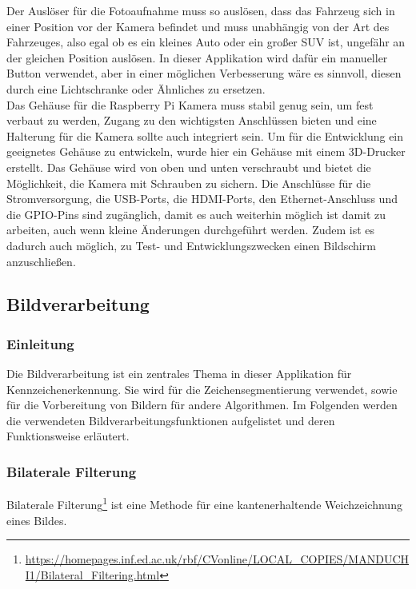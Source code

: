 Der Auslöser für die Fotoaufnahme muss so auslösen, dass das Fahrzeug sich in einer Position vor der Kamera befindet 
und muss unabhängig von der Art des Fahrzeuges, also egal ob es ein kleines Auto oder ein großer SUV ist, ungefähr an der gleichen Position auslösen. 
In dieser Applikation wird dafür ein manueller Button verwendet, aber in einer möglichen Verbesserung wäre es sinnvoll, diesen durch eine Lichtschranke oder Ähnliches zu ersetzen.\\

Das Gehäuse für die Raspberry Pi Kamera muss stabil genug sein, um fest verbaut zu werden, Zugang zu den wichtigsten Anschlüssen 
bieten und eine Halterung für die Kamera sollte auch integriert sein. Um für die Entwicklung ein geeignetes Gehäuse zu entwickeln, wurde hier ein 
Gehäuse mit einem 3D-Drucker erstellt. Das Gehäuse wird von oben und unten verschraubt und bietet die Möglichkeit, die Kamera mit Schrauben zu sichern. 
Die Anschlüsse für die Stromversorgung, die USB-Ports, die HDMI-Ports, den Ethernet-Anschluss und die GPIO-Pins sind zugänglich, damit es auch weiterhin 
möglich ist damit zu arbeiten, auch wenn kleine Änderungen durchgeführt werden. Zudem ist es dadurch auch möglich, zu Test- und Entwicklungszwecken einen Bildschirm anzuschließen.

\subsection{Bildverarbeitung}

\subsubsection{Einleitung}
Die Bildverarbeitung ist ein zentrales Thema in dieser Applikation für Kennzeichenerkennung. 
Sie wird für die Zeichensegmentierung verwendet, sowie für die Vorbereitung von Bildern für 
andere Algorithmen. Im Folgenden werden die verwendeten Bildverarbeitungsfunktionen aufgelistet 
und deren Funktionsweise erläutert.

\subsubsection{Bilaterale Filterung}
Bilaterale Filterung\footnote{\url{https://homepages.inf.ed.ac.uk/rbf/CVonline/LOCAL_COPIES/MANDUCHI1/Bilateral_Filtering.html}} ist eine Methode für eine kantenerhaltende Weichzeichnung eines Bildes.\\

